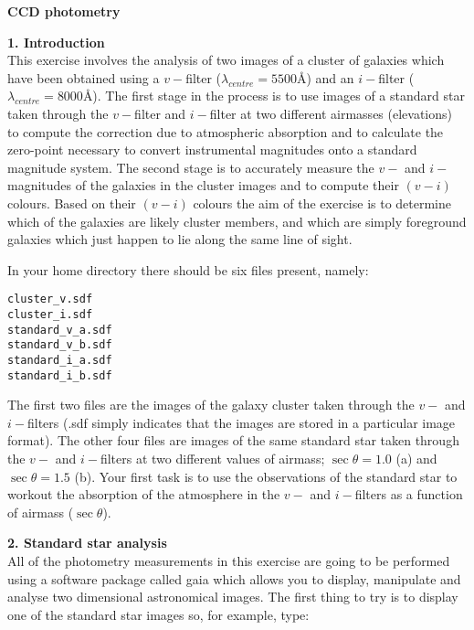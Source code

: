 \pagestyle{myheadings}
\setcounter{page}{1}

\begin{center}
{\Huge\bf CCD photometry}
\end{center}

{\bf \large{1. Introduction}}\\
This exercise involves the analysis of two images of a cluster of
galaxies which have been obtained using a
$v-$filter ($\lambda_{centre}=5500$\AA) and an $i-$filter ($\lambda_{centre}=8000$\AA). 
The first stage in the process is to use images of a standard star
taken through the $v-$filter and $i-$filter at two different airmasses
(elevations) to compute the correction due to atmospheric
absorption and to calculate the zero-point necessary to convert
instrumental magnitudes onto a standard magnitude system. The second stage is to accurately measure
the $v-$ and $i-$magnitudes of the galaxies in the cluster images and
to compute their $(v-i)$ colours. Based on their $(v-i)$
colours the aim of the exercise is to determine which of the
galaxies are likely cluster members, and which are simply
foreground galaxies which just happen to lie along the same line of sight.

\noindent
In your home directory there should be six files present, namely:

\verb,cluster_v.sdf,\\
\verb,cluster_i.sdf,\\
\verb,standard_v_a.sdf,\\
\verb,standard_v_b.sdf,\\
\verb,standard_i_a.sdf,\\
\verb,standard_i_b.sdf,

The first two files are the images of the galaxy cluster taken through
the $v-$ and $i-$filters (.sdf simply indicates that the images are stored in
a particular image format). The other four files are images of the
same standard star taken through the $v-$ and $i-$filters at two
different values of airmass; $\sec \theta=1.0$ (a) and $\sec \theta=1.5$ (b).
Your first task is to use the observations of the
standard star to workout the absorption of the atmosphere in the $v-$
and $i-$filters as a function of airmass ($\sec \theta$).

{\bf \large{2. Standard star analysis}}\\
All of the photometry measurements in this exercise are going to be
performed using a software package called {\sc gaia} which allows you 
to display, manipulate and analyse two dimensional astronomical images. The first thing to
try is to display one of the standard star images so, for example, type:

